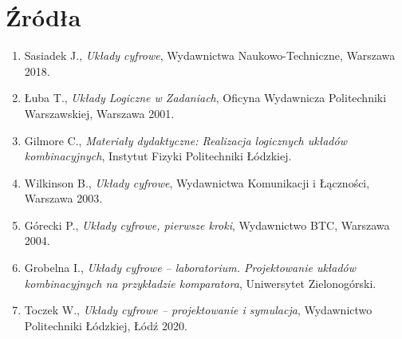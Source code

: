 %   

\section{Źródła}

\begin{enumerate}
    \item Sasiadek J., \textit{Układy cyfrowe}, Wydawnictwa Naukowo-Techniczne, Warszawa 2018.
    \item Łuba T., \textit{Układy Logiczne w Zadaniach}, Oficyna Wydawnicza Politechniki Warszawskiej, Warszawa 2001.
    \item Gilmore C., \textit{Materiały dydaktyczne: Realizacja logicznych układów kombinacyjnych}, Instytut Fizyki Politechniki Łódzkiej.
    \item Wilkinson B., \textit{Układy cyfrowe}, Wydawnictwa Komunikacji i Łączności, Warszawa 2003.
    \item Górecki P., \textit{Układy cyfrowe, pierwsze kroki}, Wydawnictwo BTC, Warszawa 2004.
    \item Grobelna I., \textit{Układy cyfrowe -- laboratorium. Projektowanie układów kombinacyjnych na przykładzie komparatora}, Uniwersytet Zielonogórski.
    \item Toczek W., \textit{Układy cyfrowe -- projektowanie i symulacja}, Wydawnictwo Politechniki Łódzkiej, Łódź 2020.
\end{enumerate}
